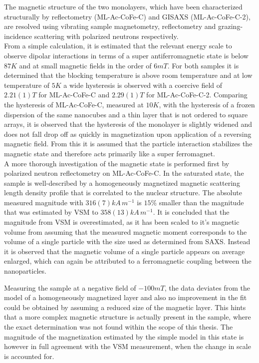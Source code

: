 \documentclass[\main/dresen_thesis.tex]{subfiles}
\begin{document}
  The magnetic structure of the two monolayers, which have been characterized structurally by reflectometry (ML-Ac-CoFe-C) and GISAXS (ML-Ac-CoFe-C-2), are resolved using vibrating sample magnetometry, reflectometry and grazing-incidence scattering with polarized neutrons respectively.
  \\

  From a simple calculation, it is estimated that the relevant energy scale to observe dipolar interactions in terms of a super antiferromagnetic state is below $87 \unit{K}$ and at small magnetic fields in the order of $6 \unit{mT}$.
  For both samples it is determined that the blocking temperature is above room temperature and at low temperature of $5 \unit{K}$ a wide hysteresis is observed with a coercive field of $2.21(1) \unit{T}$ for ML-Ac-CoFe-C and $2.29(1) \unit{T}$ for ML-Ac-CoFe-C-2.
  Comparing the hysteresis of ML-Ac-CoFe-C, measured at $10 \unit{K}$, with the hysteresis of a frozen dispersion of the same nanocubes and a thin layer that is not ordered to square arrays, it is observed that the hysteresis of the monolayer is slightly widened and does not fall drop off as quickly in magnetization upon application of a reversing magnetic field.
  From this it is assumed that the particle interaction stabilizes the magnetic state and therefore acts primarily like a super ferromagnet.
  \\
  A more thorough investigation of the magnetic state is performed first by polarized neutron reflectometry on ML-Ac-CoFe-C.
  In the saturated state, the sample is well-described by a homogeneously magnetized magnetic scattering length density profile that is correlated to the nuclear structure.
  The absolute measured magnitude with $316(7) \unit{kA \, m^{-1}}$ is $15 \%$ smaller than the magnitude that was estimated by VSM to $358(13) \unit{kA \, m^{-1}}$.
  It is concluded that the magnitude from VSM is overestimated, as it has been scaled to it's magnetic volume from assuming that the measured magnetic moment corresponds to the volume of a single particle with the size used as determined from SAXS.
  Instead it is observed that the magnetic volume of a single particle appears on average enlarged, which can again be attributed to a ferromagnetic coupling between the nanoparticles.

  Measuring the sample at a negative field of $-100 \unit{mT}$, the data deviates from the model of a homogeneously  magnetized layer and also no improvement in the fit could be obtained by assuming a reduced size of the magnetic layer.
  This hints that a more complex magnetic structure is actually present in the sample, where the exact determination was not found within the scope of this thesis.
  The magnitude of the magnetization estimated by the simple model in this state is however in full agreement with the VSM measurement, when the change in scale is accounted for.
  \\
\end{document}
